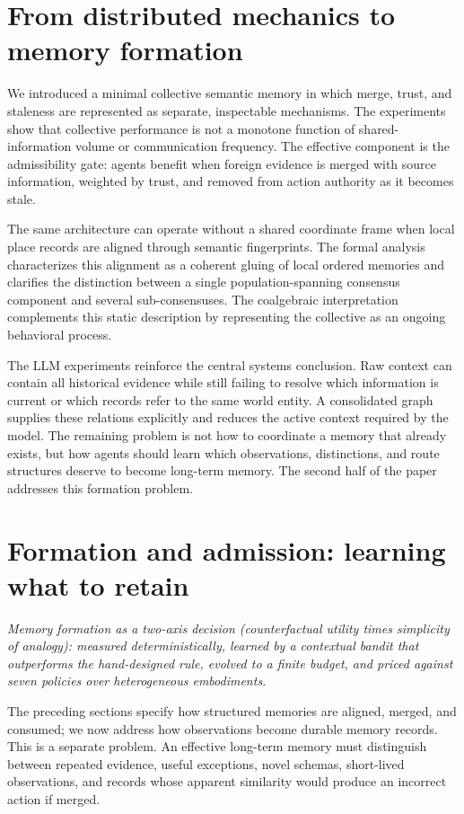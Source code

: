 \documentclass{article}
\begin{document}
\section{From distributed mechanics to memory formation}

We introduced a minimal collective semantic memory in which merge,
trust, and staleness are represented as separate, inspectable
mechanisms. The experiments show that collective performance is not a
monotone function of shared-information volume or communication
frequency. The effective component is the admissibility gate: agents
benefit when foreign evidence is merged with source information,
weighted by trust, and removed from action authority as it becomes
stale.

The same architecture can operate without a shared coordinate frame
when local place records are aligned through semantic fingerprints.
The formal analysis characterizes this alignment as a coherent gluing
of local ordered memories and clarifies the distinction between a
single population-spanning consensus component and several
sub-consensuses. The coalgebraic interpretation complements this
static description by representing the collective as an ongoing
behavioral process.

The LLM experiments reinforce the central systems conclusion. Raw
context can contain all historical evidence while still failing to
resolve which information is current or which records refer to the
same world entity. A consolidated graph supplies these relations
explicitly and reduces the active context required by the model. The
remaining problem is not how to coordinate a memory that already
exists, but how agents should learn which observations, distinctions,
and route structures deserve to become long-term memory. The second
half of the paper addresses this formation problem.


\section{Formation and admission: learning what to retain}
\label{p5:sec:intro}
\emph{Memory formation as a two-axis decision (counterfactual utility times simplicity of analogy): measured deterministically, learned by a contextual bandit that outperforms the hand-designed rule, evolved to a finite budget, and priced against seven policies over heterogeneous embodiments.}

\medskip
The preceding sections specify how structured memories are aligned,
merged, and consumed; we now address how observations become durable
memory records. This is a
separate problem. An effective long-term memory must distinguish
between repeated evidence, useful exceptions, novel schemas,
short-lived observations, and records whose apparent similarity would
produce an incorrect action if merged.
\end{document}
